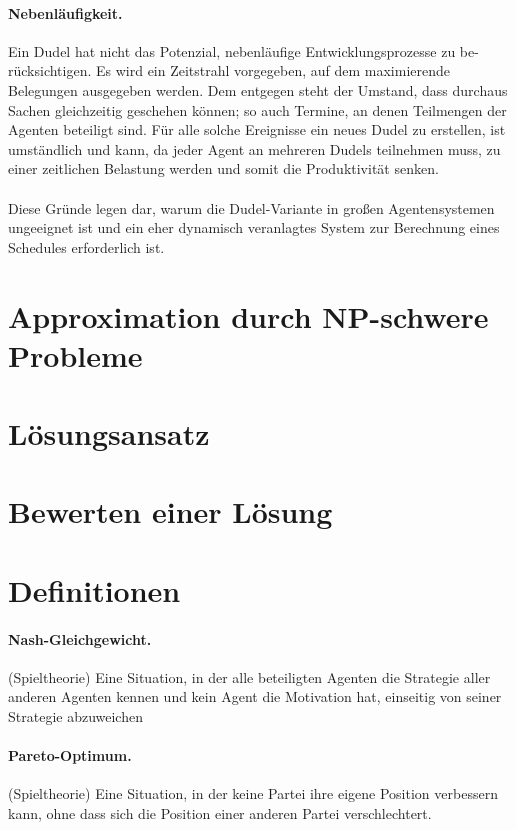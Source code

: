 \documentclass[12pt,twoside]{article}
\theoremstyle{plain}
\theoremstyle{definition}
\theoremstyle{remark}
\newcommand{\pbreak}{\paragraph*{}}
\begin{document}
\paragraph{Nebenläufigkeit.}
Ein Dudel hat nicht das Potenzial, nebenläufige Entwicklungsprozesse zu be-rücksichtigen.
Es wird ein Zeitstrahl vorgegeben, auf dem maximierende Belegungen ausgegeben werden.
Dem entgegen steht der Umstand, dass durchaus Sachen gleichzeitig geschehen können; so auch Termine, an denen Teilmengen der Agenten beteiligt sind.
Für alle solche Ereignisse ein neues Dudel zu erstellen, ist umständlich und kann, da jeder Agent an mehreren Dudels teilnehmen muss, zu einer zeitlichen Belastung werden und somit die Produktivität senken.
\pbreak
Diese Gründe legen dar, warum die Dudel-Variante in großen Agentensystemen ungeeignet ist und ein eher dynamisch veranlagtes System zur Berechnung eines Schedules erforderlich ist.

\section{Approximation durch NP-schwere Probleme}
\label{sec:approx}
\lipsum[7-27]
\lipsum[52-55]

\section{Lösungsansatz}
\label{sec:sol}
\lipsum[28-39]

\section{Bewerten einer Lösung}
\label{sec:eval}
\lipsum[40-50]

\newpage
{}
\section*{Definitionen}
\paragraph*{Nash-Gleichgewicht.}
	\label{def:nash}
	(Spieltheorie) Eine Situation, in der alle beteiligten Agenten die Strategie aller anderen Agenten kennen und kein Agent die Motivation hat, einseitig von seiner Strategie abzuweichen
\paragraph*{Pareto-Optimum.}
	\label{def:pareto}
	(Spieltheorie) Eine Situation, in der keine Partei ihre eigene Position verbessern kann, ohne dass sich die Position einer anderen Partei verschlechtert.
\end{document}

